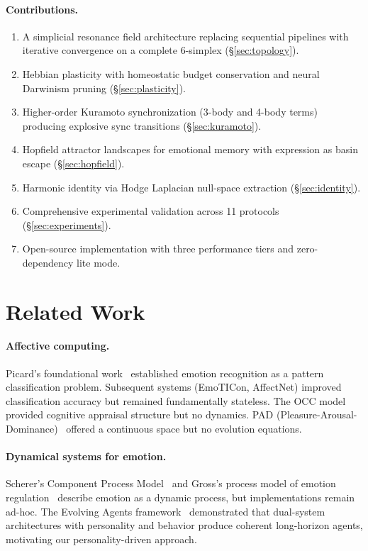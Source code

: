 \documentclass[11pt]{article}
\begin{document}
\paragraph{Contributions.}
\begin{enumerate}[leftmargin=*]
\item A simplicial resonance field architecture replacing sequential pipelines with iterative convergence on a complete 6-simplex (\S\ref{sec:topology}).
\item Hebbian plasticity with homeostatic budget conservation and neural Darwinism pruning (\S\ref{sec:plasticity}).
\item Higher-order Kuramoto synchronization (3-body and 4-body terms) producing explosive sync transitions (\S\ref{sec:kuramoto}).
\item Hopfield attractor landscapes for emotional memory with expression as basin escape (\S\ref{sec:hopfield}).
\item Harmonic identity via Hodge Laplacian null-space extraction (\S\ref{sec:identity}).
\item Comprehensive experimental validation across 11 protocols (\S\ref{sec:experiments}).
\item Open-source implementation with three performance tiers and zero-dependency lite mode.
\end{enumerate}

\section{Related Work}
\label{sec:related}

\paragraph{Affective computing.} Picard's foundational work~\cite{picard1997} established emotion recognition as a pattern classification problem. Subsequent systems (EmoTICon, AffectNet) improved classification accuracy but remained fundamentally stateless. The OCC model~\cite{occ1988} provided cognitive appraisal structure but no dynamics. PAD (Pleasure-Arousal-Dominance)~\cite{mehrabian1996} offered a continuous space but no evolution equations.

\paragraph{Dynamical systems for emotion.} Scherer's Component Process Model~\cite{scherer2001} and Gross's process model of emotion regulation~\cite{gross2015} describe emotion as a dynamic process, but implementations remain ad-hoc. The Evolving Agents framework~\cite{evolving2024} demonstrated that dual-system architectures with personality and behavior produce coherent long-horizon agents, motivating our personality-driven approach.
\end{document}
